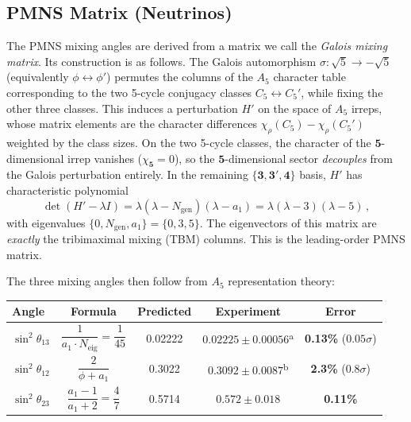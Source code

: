 \documentclass[12pt,a4paper]{article}
\theoremstyle{definition}
\begin{document}
\subsection{PMNS Matrix (Neutrinos)}

The PMNS mixing angles are derived from a matrix we call the \emph{Galois mixing matrix}.  Its construction is as follows.  The Galois automorphism $\sigma: \sqrt{5} \to -\sqrt{5}$ (equivalently $\phi \leftrightarrow \phi'$) permutes the columns of the $A_5$ character table corresponding to the two 5-cycle conjugacy classes $C_5 \leftrightarrow C_5'$, while fixing the other three classes.  This induces a perturbation $H'$ on the space of $A_5$ irreps, whose matrix elements are the character differences $\chi_\rho(C_5) - \chi_\rho(C_5')$ weighted by the class sizes.  On the two 5-cycle classes, the character of the $\mathbf{5}$-dimensional irrep vanishes ($\chi_{\mathbf{5}} = 0$), so the $\mathbf{5}$-dimensional sector \emph{decouples} from the Galois perturbation entirely.  In the remaining $\{\mathbf{3}, \mathbf{3'}, \mathbf{4}\}$ basis, $H'$ has characteristic polynomial
\begin{equation}
\det(H' - \lambda I) = \lambda(\lambda - N_{\text{gen}})(\lambda - a_1) = \lambda(\lambda - 3)(\lambda - 5)\,,
\end{equation}
with eigenvalues $\{0, N_{\text{gen}}, a_1\} = \{0, 3, 5\}$.  The eigenvectors of this matrix are \emph{exactly} the tribimaximal mixing (TBM) columns.  This is the leading-order PMNS matrix.

The three mixing angles then follow from $A_5$ representation theory:

\begin{center}
\begin{tabular}{lcccc}
\toprule
\textbf{Angle} & \textbf{Formula} & \textbf{Predicted} & \textbf{Experiment} & \textbf{Error} \\
\midrule
$\sin^2\theta_{13}$ & $\dfrac{1}{a_1 \cdot N_{\text{eig}}} = \dfrac{1}{45}$ & 0.02222 & $0.02225 \pm 0.00056$\textsuperscript{a} & \textbf{0.13\%} ($0.05\sigma$) \\[8pt]
$\sin^2\theta_{12}$ & $\dfrac{2}{\phi + a_1}$ & 0.3022 & $0.3092 \pm 0.0087$\textsuperscript{b} & \textbf{2.3\%} ($0.8\sigma$) \\[8pt]
$\sin^2\theta_{23}$ & $\dfrac{a_1 - 1}{a_1 + 2} = \dfrac{4}{7}$ & 0.5714 & $0.572 \pm 0.018$ & \textbf{0.11\%} \\
\bottomrule
\end{tabular}
\end{center}
\end{document}
